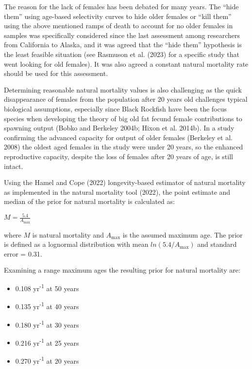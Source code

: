 \documentclass[11pt,
  english,
  letterpaper,
]{article}
\providecommand{\tightlist}{%
  \setlength{\itemsep}{0pt}\setlength{\parskip}{0pt}}
\providecommand{\tightlist}{%
  \setlength{\itemsep}{0pt}\setlength{\parskip}{0pt}}
\begin{document}
The reason for the lack of females has been debated for many years. The ``hide them'' using age-based selectivity curves to hide older females or ``kill them'' using the above mentioned ramps of death to account for no older females in samples was specifically considered since the last assessment among researchers from California to Alaska, and it was agreed that the ``hide them'' hypothesis is the least feasible situation (see Rasmuson et al. (2023) for a specific study that went looking for old females). It was also agreed a constant natural mortality rate should be used for this assessment.

Determining reasonable natural mortality values is also challenging as the quick disappearance of females from the population after 20 years old challenges typical biological assumptions, especially since Black Rockfish have been the focus species when developing the theory of big old fat fecund female contributions to spawning output (Bobko and Berkeley 2004b; Hixon et al. 2014b). In a study confirming the advanced capacity for output of older females (Berkeley et al. 2008) the oldest aged females in the study were under 20 years, so the enhanced reproductive capacity, despite the loss of females after 20 years of age, is still intact.

Using the Hamel and Cope (2022) longevity-based estimator of natural mortality as implemented in the natural mortality tool (2022), the point estimate and median of the prior for natural mortality is calculated as:

\begin{centering}

$M=\frac{5.4}{A_{\text{max}}}$

\end{centering}

\vspace{0.5cm}

where \(M\) is natural mortality and \({A_{\text{max}}}\) is the assumed maximum age. The prior is defined as a lognormal distribution with mean \(ln(5.4/A_{\text{max}})\) and standard error = 0.31.

Examining a range maximum ages the resulting prior for natural mortality are:

\begin{itemize}
\tightlist
\item
  0.108 yr\textsuperscript{-1} at 50 years
\item
  0.135 yr\textsuperscript{-1} at 40 years
\item
  0.180 yr\textsuperscript{-1} at 30 years
\item
  0.216 yr\textsuperscript{-1} at 25 years
\item
  0.270 yr\textsuperscript{-1} at 20 years
\end{itemize}
\end{document}
